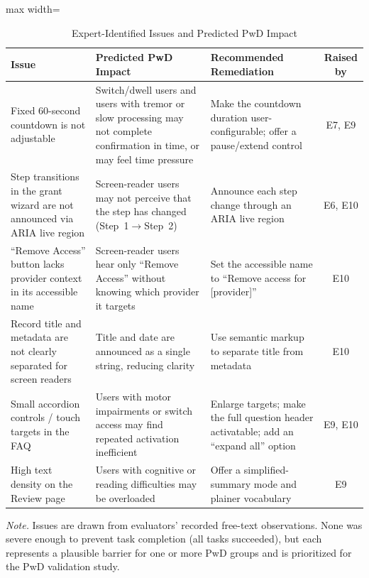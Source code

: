 \documentclass[journal,onecolumn]{IEEEtran}
\begin{document}
\begin{table}[htbp]
\centering
\caption{Expert-Identified Issues and Predicted PwD Impact}
\label{tab:expert-issues}
\small
\begin{adjustbox}{max width=\columnwidth}
\begin{tabular}{|p{2.4cm}|p{2.6cm}|p{2.4cm}|c|}
\hline
\textbf{Issue} & \textbf{Predicted PwD Impact} & \textbf{Recommended Remediation} & \textbf{Raised by} \\
\hline
Fixed 60-second countdown is not adjustable & Switch/dwell users and users with tremor or slow processing may not complete confirmation in time, or may feel time pressure & Make the countdown duration user-configurable; offer a pause/extend control & E7, E9 \\
\hline
Step transitions in the grant wizard are not announced via ARIA live region & Screen-reader users may not perceive that the step has changed (Step~1$\rightarrow$Step~2) & Announce each step change through an ARIA live region & E6, E10 \\
\hline
``Remove Access'' button lacks provider context in its accessible name & Screen-reader users hear only ``Remove Access'' without knowing which provider it targets & Set the accessible name to ``Remove access for [provider]'' & E10 \\
\hline
Record title and metadata are not clearly separated for screen readers & Title and date are announced as a single string, reducing clarity & Use semantic markup to separate title from metadata & E10 \\
\hline
Small accordion controls / touch targets in the FAQ & Users with motor impairments or switch access may find repeated activation inefficient & Enlarge targets; make the full question header activatable; add an ``expand all'' option & E9, E10 \\
\hline
High text density on the Review page & Users with cognitive or reading difficulties may be overloaded & Offer a simplified-summary mode and plainer vocabulary & E9 \\
\hline
\end{tabular}
\end{adjustbox}
{\footnotesize\textit{Note.} Issues are drawn from evaluators' recorded free-text observations. None was severe enough to prevent task completion (all tasks succeeded), but each represents a plausible barrier for one or more PwD groups and is prioritized for the PwD validation study.}
\end{table}
\end{document}
